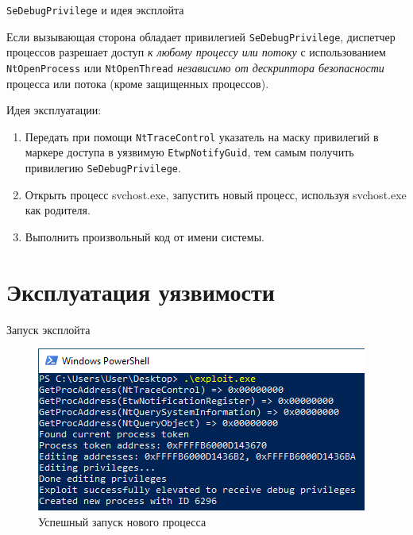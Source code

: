 \documentclass{beamer}
\begin{document}
\begin{frame}{\texttt{SeDebugPrivilege} и идея эксплойта}
    
    Если вызывающая сторона обладает привилегией \texttt{SeDebugPrivilege}, диспетчер процессов разрешает доступ \textit{к любому процессу или потоку} с использованием \texttt{NtOpenProcess} или \texttt{NtOpenThread} \textit{независимо от дескриптора безопасности} процесса или потока (кроме защищенных процессов).
    
    \begin{alertblock}{Идея эксплуатации:}
        \begin{enumerate}
            \item Передать при помощи \texttt{NtTraceControl} указатель на маску привилегий в маркере доступа в уязвимую \texttt{EtwpNotifyGuid}, тем самым получить привилегию \texttt{SeDebugPrivilege}.
            \item Открыть процесс svchost.exe, запустить новый процесс, используя svchost.exe как родителя.
            \item Выполнить произвольный код от имени системы.
        \end{enumerate}
    \end{alertblock}

\end{frame}


\section{Эксплуатация уязвимости}

\begin{frame}{Запуск эксплойта}
    
    \begin{figure}[h]
        \centering
        \includegraphics[scale=1]{exploit}
        \caption{Успешный запуск нового процесса}
    \end{figure}
    
\end{frame}
\end{document}
